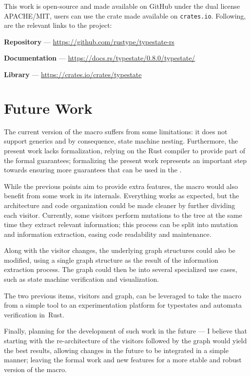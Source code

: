 
This work is open-source and made available on GitHub under the dual license APACHE/MIT,
users can use the crate made available on \texttt{crates.io}.
Following, are the relevant links to the project:
\begin{compactitem}
    \item \textbf{Repository} --- \url{https://github.com/rustype/typestate-rs}
    \item \textbf{Documentation} --- \url{https://docs.rs/typestate/0.8.0/typestate/}
    \item \textbf{Library} --- \url{https://crates.io/crates/typestate}
\end{compactitem}

\section{Future Work}

The current version of the macro suffers from some limitations:
it does not support generics and by consequence, state machine nesting.
Furthermore, the present work lacks formalization, relying on the Rust compiler to provide part of the formal guarantees;
formalizing the present work represents an important step towards ensuring more guarantees that can be used in the .

While the previous points aim to provide extra features, the macro would also benefit from some work in its internals.
Everything works as expected, but the architecture and code organization could be made cleaner by further dividing each visitor.
Currently, some visitors perform mutations to the tree at the same time they extract relevant information;
this process can be split into mutation and information extraction, easing code readability and maintenance.

Along with the visitor changes, the underlying graph structures could also be modified,
using a single graph structure as the result of the information extraction process.
The graph could then be  into several specialized use cases, such as state machine verification and visualization.

The two previous items, visitors and graph,
can be leveraged to take the macro from a simple tool to an experimentation platform for typestates and automata verification in~Rust.

Finally, planning for the development of such work in the future ---
I believe that starting with the re-architecture of the visitors followed by the graph would yield the best results,
allowing changes in the future to be integrated in a simple manner;
leaving the formal work and new features for a more stable and robust version of the macro.
